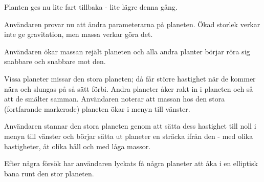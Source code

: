 Planten ges nu lite fart tillbaka - lite lägre denna gång.

Användaren provar nu att ändra parameterarna på planeten.
Ökad storlek verkar inte ge gravitation, men massa verkar göra det.

Användaren ökar massan rejält planeten och alla andra planter börjar
röra sig snabbare och snabbare mot den.

Vissa planeter missar den stora planeten; då får större hastighet när
de kommer nära och slungas på så sätt förbi.
Andra planeter åker rakt in i planeten och så att de smälter samman.
Användaren noterar att massan hos den stora (fortfarande markerade)
planeten ökar i menyn till vänster.

Användaren stannar den stora planeten genom att sätta dess hastighet till
noll i menyn till vänster och
börjar sätta ut planeter en sträcka ifrån den
- med olika hastigheter, åt olika håll och med låga massor.

Efter några försök har användaren lyckats få några planeter att åka i en
elliptisk bana runt den stor planeten.

